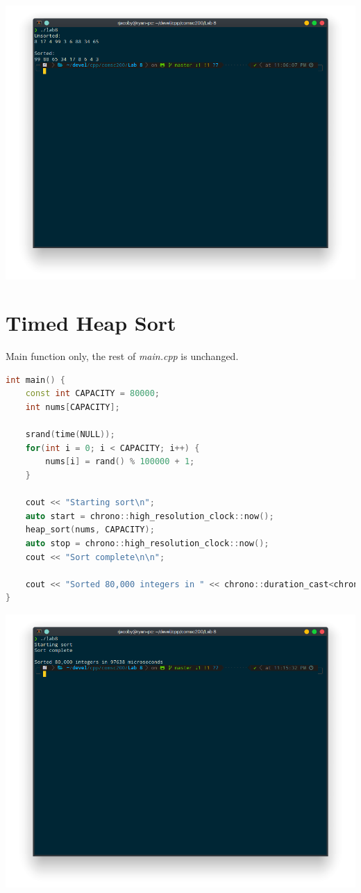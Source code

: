 \documentclass[letterpaper, 11pt]{article}
\begin{document}
\includegraphics[scale=0.5]{heap_sort.png}

\section{Timed Heap Sort}
Main function only, the rest of \textit{main.cpp} is unchanged.
\begin{lstlisting}[language=c++, caption=main]
int main() {
    const int CAPACITY = 80000;
    int nums[CAPACITY];
    
    srand(time(NULL));
    for(int i = 0; i < CAPACITY; i++) {
        nums[i] = rand() % 100000 + 1;
    }

    cout << "Starting sort\n";
    auto start = chrono::high_resolution_clock::now();
    heap_sort(nums, CAPACITY);
    auto stop = chrono::high_resolution_clock::now();
    cout << "Sort complete\n\n";

    cout << "Sorted 80,000 integers in " << chrono::duration_cast<chrono::microseconds>(stop - start).count() << " microseconds\n";
}
\end{lstlisting}

\includegraphics[scale=0.5]{heap_sort_timed.png}
\end{document}
